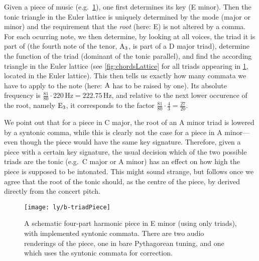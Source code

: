 \documentclass[british,11pt]{scrartcl}
\begin{document}
Given a piece of music (e.g.\ \cref{fig:triadPiece}), one first determines its
key (E minor).  Then the tonic triangle in the Euler lattice is uniquely
determined by the mode (major or minor) and the requirement that the \emph{root}
(here: E) is not altered by a comma. For each ocurring note, we then determine,
by looking at all voices, the triad it is part of (the fourth note of the tenor,
$\text{A}_3$, is part of a D major triad), determine the function of the triad
(dominant of the tonic parallel), and find the according triangle in the Euler
lattice (see \cref{fig:chordsLattice} for all triads appearing in
\cref{fig:triadPiece}, located in the Euler lattice). This then tells us exactly
how many commata we have to apply to the note (here: $\text{A}$ has to be raised by
one). Its absolute frequency is
$\frac{81}{80}\cdot 220\,\text{Hz}=222.75\,\text{Hz}$, and relative to the next
lower occurence of the root, namely $\text{E}_3$, it corresponds to the factor
$\frac{81}{80}\cdot \frac{4}{3}=\frac{27}{20}$.

We point out that for a piece in C major, the root of an A minor triad is
lowered by a syntonic comma, while this is clearly not the case for a piece in A
minor—even though the piece would have the same key signature. Therefore, given
a piece with a certain key signature, the usual decision which of the two
possible triads are the tonic (e.g.\ C major or A minor) has an effect on how
high the piece is supposed to be intonated.  This might sound strange, but
follows once we agree that the root of the tonic should, as the centre of the
piece, by derived directly from the concert pitch.

\begin{figure}
  \centering
  \texttt{[image: ly/b-triadPiece]}
  \caption{A schematic four-part harmonic piece in E minor (using only triads),
    with im\-ple\-men\-ted syntonic commata.  There are two audio renderings of
    the piece, one in bare Pythagorean tuning, and one which uses the syntonic
    commata for correction.}\label{fig:triadPiece}
\end{figure}
\end{document}
